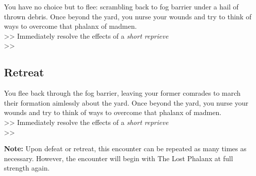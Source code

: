 You have no choice but to flee: scrambling back to fog barrier under a hail of thrown debris. Once beyond the yard, you nurse your wounds and try to think of ways to overcome that phalanx of madmen.\\

>> Immediately resolve the effects of a \emph{short reprieve}\\
>> 

\subsection*{Retreat}
You flee back through the fog barrier, leaving your former comrades to march their formation aimlessly about the yard. Once beyond the yard, you nurse your wounds and try to think of ways to overcome that phalanx of madmen.\\

>> Immediately resolve the effects of a \emph{short reprieve}\\
>> \\

\begin{tcolorbox}
\textbf{Note:} Upon defeat or retreat, this encounter can be repeated as many times as necessary. However, the encounter will begin with The Lost Phalanx at full strength again.
\end{tcolorbox}